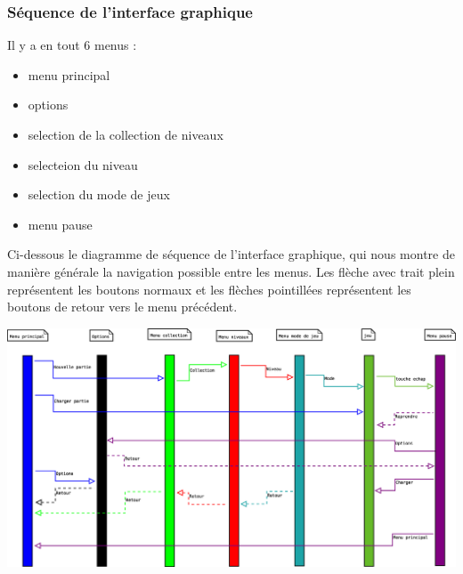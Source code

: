 \documentclass{article}
\begin{document}
			\subsubsection{Séquence de l'interface graphique}

Il y a en tout 6 menus :
\begin{itemize}
 \item menu principal
 \item options
 \item selection de la collection de niveaux
 \item selecteion du niveau
 \item selection du mode de jeux
 \item menu pause
\end{itemize}
Ci-dessous le diagramme de séquence de l'interface graphique, qui nous montre de manière générale la navigation possible entre les menus. Les flèche avec trait plein représentent les boutons normaux et les flèches pointillées représentent
 les boutons de retour vers le menu précédent.

\begin{center}
\includegraphics[scale=0.3,angle=-90]{sequence/Diagramme1.eps}
\end{center}
\end{document}

